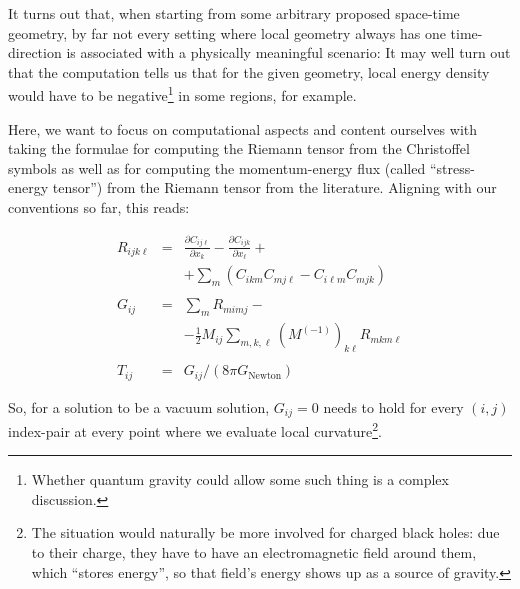\documentclass[twocolumn]{article}
\begin{document}
It turns out that, when starting from some arbitrary proposed
space-time geometry, by far not every setting where local geometry
always has one time-direction is associated with a physically
meaningful scenario: It may well turn out that the computation tells
us that for the given geometry, local energy density would have to be
negative\footnote{Whether quantum gravity could allow some such thing
is a complex discussion.} in some regions, for example.

Here, we want to focus on computational aspects and content ourselves
with taking the formulae for computing the Riemann tensor from the
Christoffel symbols as well as for computing the momentum-energy flux
(called ``stress-energy tensor'') from the Riemann tensor from the
literature. Aligning with our conventions so far, this reads:

\begin{equation}
  \begin{array}{lcl}
    R_{ijk\ell}&=&\frac{\partial C_{ij\ell}}{\partial x_k}-\frac{\partial C_{ijk}}{\partial x_\ell}+\\
    &&+\sum_{m}\left(C_{ikm}C_{mj\ell}-C_{i\ell m}C_{mjk}\right)\\
    &&\\
    G_{ij}&=&\sum_m R_{mimj}-\\
    &&-\frac{1}{2}M_{ij}\sum_{m,k,\ell}\left(M^{(-1)}\right)_{k\ell}R_{mkm\ell}\\
    &&\\
    T_{ij}&=&G_{ij}/(8\pi G_\text{Newton})
  \end{array}
\end{equation}

So, for a solution to be a vacuum solution, $G_{ij}=0$ needs to hold
for every $(i,j)$ index-pair at every point where we evaluate local
curvature\footnote{The situation would naturally be more involved for
charged black holes: due to their charge, they have to have an
electromagnetic field around them, which ``stores energy'', so that
field's energy shows up as a source of gravity.}.
\end{document}
